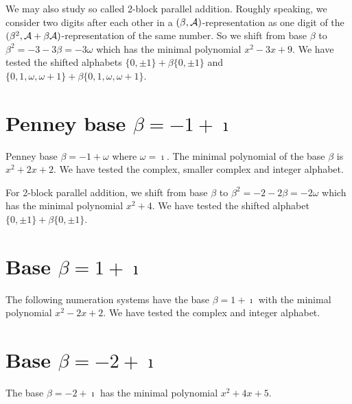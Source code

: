 



We may also study so called 2-block parallel addition. Roughly speaking, we consider two digits after each other in a $(\beta,\mathcal{A})$-representation as one digit of the $(\beta^2,\mathcal{A}+\beta\mathcal{A})$-representation of the same number. So we shift from base $\beta$ to $\beta^2=-3-3\beta=-3\omega$ which has the minimal polynomial $x^2-3x+9$. We have tested the shifted alphabets $\{0,\pm 1\}+\beta \{0,\pm 1\}$ and $\{0,1, \omega, \omega +1\}+\beta \{0,1, \omega, \omega +1\}$.
  



\section{\texorpdfstring{Penney base $\beta = -1 + \imath$}{Penney base beta = -1 + i}}
Penney base $\beta = -1 + \omega$ where $\omega=\imath$. The minimal polynomial of the base $\beta$ is $x^2 + 2x+2$. We have tested the complex, smaller complex and integer alphabet.
% 
% 
% 

For 2-block parallel addition, we shift from base $\beta$ to $\beta^2=-2-2\beta=-2\omega$ which has the minimal polynomial $x^{2} + 4$. We have tested the shifted alphabet $\{0,\pm 1\}+\beta \{0,\pm 1\}$.

% 

\section{\texorpdfstring{Base $\beta = 1 + \imath$}{Base beta = 1 + i}}
The following numeration systems have the base $\beta =1 + \imath$ with the minimal polynomial $x^2-2x+2$. We have tested the complex and integer alphabet.



 

\section{Base $\beta = -2 + \imath$}
The base  $\beta = -2 + \imath$ has the minimal polynomial $x^2+4x +5$.

% 

